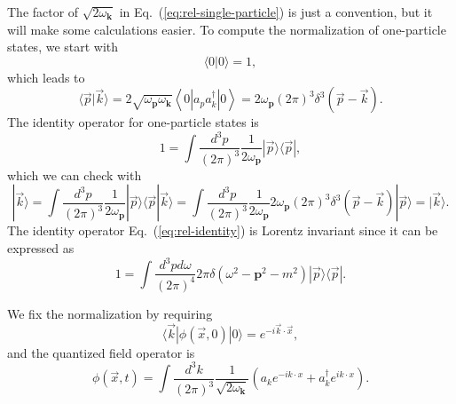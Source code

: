 \begin{framedrmk}
The factor of $\sqrt{2 \omega_{\bm k}}$ in Eq.~(\ref{eq:rel-single-particle}) is just a convention, but it will make some calculations easier. 
To compute the normalization of one-particle states, we start with
\begin{equation}
	\langle 0|0\rangle=1,
\end{equation}
which leads to
\begin{equation}
	\langle\vec{p}|\vec{k}\rangle 
	= 2\sqrt{\omega_{\bm p} \omega_{\bm k}}\left\langle 0\left|a_{p} a_{k}^{\dagger}\right| 0\right\rangle
	= 2 \omega_{\bm p}(2\pi)^{3} \delta^{3}(\vec{p}-\vec{k}).
\end{equation}
The identity operator for one-particle states is
\begin{equation}
	1=\int \frac{d^{3} p}{(2\pi)^{3}} \frac{1}{2\omega_{\bm p}}|\vec{p}\rangle\langle\vec{p}|, \label{eq:rel-identity}
\end{equation}
which we can check with
\begin{equation*}
	|\vec{k}\rangle
	=\int \frac{d^{3} p}{(2\pi)^{3}} \frac{1}{2\omega_{\bm p}}|\vec{p}\rangle\langle\vec{p}|\vec{k}\rangle
	=\int \frac{d^{3} p}{(2\pi)^{3}} \frac{1}{2\omega_{\bm p}} 2\omega_{\bm p}(2\pi)^3 \delta^3(\vec{p}-\vec{k})|\vec{p}\rangle
	=|\vec{k}\rangle.
\end{equation*}
The identity operator Eq.~(\ref{eq:rel-identity}) is Lorentz invariant since it can be expressed as
\begin{equation}
	1 = \int \frac{d^{3} p d\omega}{(2\pi)^{4}} 2\pi\delta(\omega^2-{\bm{p}}^2-m^2) |\vec p\rangle\langle \vec p|.
\end{equation}
\end{framedrmk}

We fix the normalization by requiring 
\begin{equation*}
	\langle \vec k|\phi(\vec x,0)|0\rangle = e^{-i \vec k\cdot \vec x},
\end{equation*}
and the quantized field operator is
\begin{equation}
	\phi(\vec{x}, t)
	=\int \frac{d^{3} k}{(2\pi)^{3}} \frac{1}{\sqrt{2\omega_{\bm k}}}\left(a_k 
	e^{-i k \cdot x}+a_k^{\dagger} e^{i k \cdot x}\right).
\end{equation}

